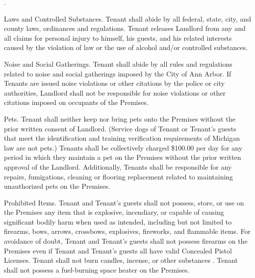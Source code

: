 \documentclass{article}
\begin{document}
\begin{compactList}{.}{}
  \item {\titleStyle Laws and Controlled Substances.} Tenant shall abide by all
  federal, state, city, and county laws, ordinances and regulations. Tenant
  releases Landlord from any and all claims for personal injury to himself, his
  guests, and his related interests caused by the violation of law or the use of
  alcohol and/or controlled substances.

  \item {\titleStyle Noise and Social Gatherings.} Tenant shall abide by all
  rules and regulations related to noise and social gatherings imposed by the
  City of Ann Arbor. If Tenants are issued noise violations or other citations
  by the police or city authorities, Landlord shall not be responsible for noise
  violations or other citations imposed on occupants of the Premises.

  \item {\titleStyle Pets.} Tenant shall neither keep nor bring pets onto the
  Premises without the prior written consent of Landlord. (Service dogs of
  Tenant or Tenant’s guests that meet the identification and training
  verification requirements of Michigan law are not pets.) Tenants shall be
  collectively charged \$100.00 per day for any period in which they maintain a
  pet on the Premises without the prior written approval of the Landlord.
  Additionally, Tenants shall be responsible for any repairs, fumigations,
  cleaning or flooring replacement related to maintaining unauthorized pets on
  the Premises.


  \item {\titleStyle Prohibited Items.} Tenant and Tenant’s guests shall not
  possess, store, or use on the Premises any item that is explosive, incendiary,
  or capable of causing significant bodily harm when used as intended, including
  but not limited to firearms, bows, arrows, crossbows, explosives, fireworks,
  and flammable items. For avoidance of doubt, Tenant and Tenant’s guests shall
  not possess firearms on the Premises even if Tenant and Tenant’s guests all
  have valid Concealed Pistol Licenses. Tenant shall not burn candles, incense,
  or other substances%
  . Tenant shall not possess a fuel-burning space heater on the Premises.


\end{compactList}
\end{document}
